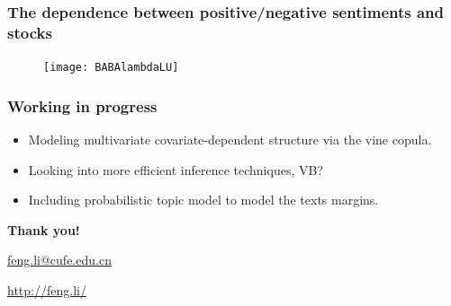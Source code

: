\documentclass[10pt,aspectratio=169]{beamer}
\begin{document}
\begin{frame}
  \frametitle{The dependence between positive/negative sentiments and stocks}

  \begin{figure}
    \centering
    \texttt{[image: BABAlambdaLU]}
  \end{figure}

\end{frame}
\begin{frame}
  \frametitle{Working in progress }

  \begin{itemize}
  \item Modeling multivariate covariate-dependent structure via the vine copula.
  \item Looking into more efficient inference techniques, VB?
  \item Including probabilistic topic model to model the texts margins.
  \end{itemize}
\end{frame}


%   
%   
\begin{frame}[plain]
  \addtocounter{framenumber}{-1}
  \begin{center}
    {\color{SUblue} \textbf{\Huge Thank you!}}
    \vspace{1cm}

    \url{feng.li@cufe.edu.cn}

    \vspace{1cm}

    \url{http://feng.li/}

  \end{center}
\end{frame}
\end{document}

